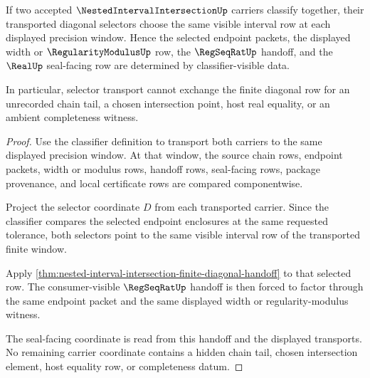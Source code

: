 \begin{theorem}
\label{thm:nested-interval-intersection-selector-transport-determinacy}
If two accepted $\NestedIntervalIntersectionUp$ carriers classify together,
their transported diagonal selectors choose the same visible interval row at
each displayed precision window. Hence the selected endpoint packets, the
displayed width or $\RegularityModulusUp$ row, the $\RegSeqRatUp$ handoff, and
the $\RealUp$ seal-facing row are determined by classifier-visible data.

In particular, selector transport cannot exchange the finite diagonal row for
an unrecorded chain tail, a chosen intersection point, host real equality, or
an ambient completeness witness.
\end{theorem}
\begin{proof}
Use the classifier definition to transport both carriers to the same displayed
precision window. At that window, the source chain rows, endpoint packets,
width or modulus rows, handoff rows, seal-facing rows, package provenance, and
local certificate rows are compared componentwise.

Project the selector coordinate $D$ from each transported carrier. Since the
classifier compares the selected endpoint enclosures at the same requested
tolerance, both selectors point to the same visible interval row of the
transported finite window.

Apply
\autoref{thm:nested-interval-intersection-finite-diagonal-handoff} to that
selected row. The consumer-visible $\RegSeqRatUp$ handoff is then forced to
factor through the same endpoint packet and the same displayed width or
regularity-modulus witness.

The seal-facing coordinate is read from this handoff and the displayed
transports. No remaining carrier coordinate contains a hidden chain tail,
chosen intersection element, host equality row, or completeness datum.
\end{proof}

